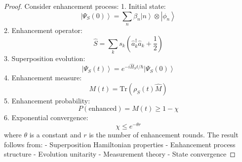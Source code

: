 \documentclass[12pt]{article}
\newcommand{\ket}[1]{\left|#1\right\rangle}
\newcommand{\tr}{\text{Tr}}
\newcommand{\op}[1]{\hat{#1}}
\begin{document}
\begin{proof}
Consider enhancement process:
1. Initial state:
\begin{equation}
\ket{\Psi_S(0)} = \sum_n \beta_n\ket{n} \otimes \ket{\phi_n}
\end{equation}
2. Enhancement operator:
\begin{equation}
\op{S} = \sum_k s_k(\op{a}_k^\dagger\op{a}_k + \frac{1}{2})
\end{equation}
3. Superposition evolution:
\begin{equation}
\ket{\Psi_S(t)} = e^{-i\op{H}_St/\hbar}\ket{\Psi_S(0)}
\end{equation}
4. Enhancement measure:
\begin{equation}
M(t) = \tr(\rho_S(t)\op{M})
\end{equation}
5. Enhancement probability:
\begin{equation}
P(\text{enhanced}) = M(t) \geq 1 - \chi
\end{equation}
6. Exponential convergence:
\begin{equation}
\chi \leq e^{-\theta r}
\end{equation}
where $\theta$ is a constant and $r$ is the number of enhancement rounds.
The result follows from:
- Superposition Hamiltonian properties
- Enhancement process structure
- Evolution unitarity
- Measurement theory
- State convergence
\end{proof}
\end{document}
